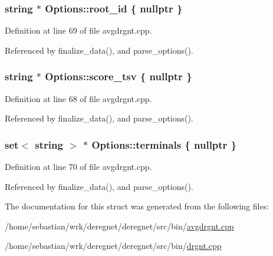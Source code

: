 \subsubsection[{\texorpdfstring{root\+\_\+id}{root_id}}]{\setlength{\rightskip}{0pt plus 5cm}string $\ast$ Options\+::root\+\_\+id \{ nullptr \}}\hypertarget{structOptions_a7df263753dc02f88a187ed119f3f8c37}{}\label{structOptions_a7df263753dc02f88a187ed119f3f8c37}


Definition at line 69 of file avgdrgnt.\+cpp.



Referenced by finalize\+\_\+data(), and parse\+\_\+options().

\subsubsection[{\texorpdfstring{score\+\_\+tsv}{score_tsv}}]{\setlength{\rightskip}{0pt plus 5cm}string $\ast$ Options\+::score\+\_\+tsv \{ nullptr \}}\hypertarget{structOptions_a1f2fa7263f58ae203aa79f71b4a26540}{}\label{structOptions_a1f2fa7263f58ae203aa79f71b4a26540}


Definition at line 68 of file avgdrgnt.\+cpp.



Referenced by finalize\+\_\+data(), and parse\+\_\+options().

\subsubsection[{\texorpdfstring{terminals}{terminals}}]{\setlength{\rightskip}{0pt plus 5cm}set$<$ string $>$ $\ast$ Options\+::terminals \{ nullptr \}}\hypertarget{structOptions_a50e99d4f8be4e78eea581ea9378d3b4a}{}\label{structOptions_a50e99d4f8be4e78eea581ea9378d3b4a}


Definition at line 70 of file avgdrgnt.\+cpp.



Referenced by finalize\+\_\+data(), and parse\+\_\+options().



The documentation for this struct was generated from the following files\+:\begin{DoxyCompactItemize}
\item 
/home/sebastian/wrk/deregnet/deregnet/src/bin/\hyperlink{avgdrgnt_8cpp}{avgdrgnt.\+cpp}\item 
/home/sebastian/wrk/deregnet/deregnet/src/bin/\hyperlink{drgnt_8cpp}{drgnt.\+cpp}\end{DoxyCompactItemize}
